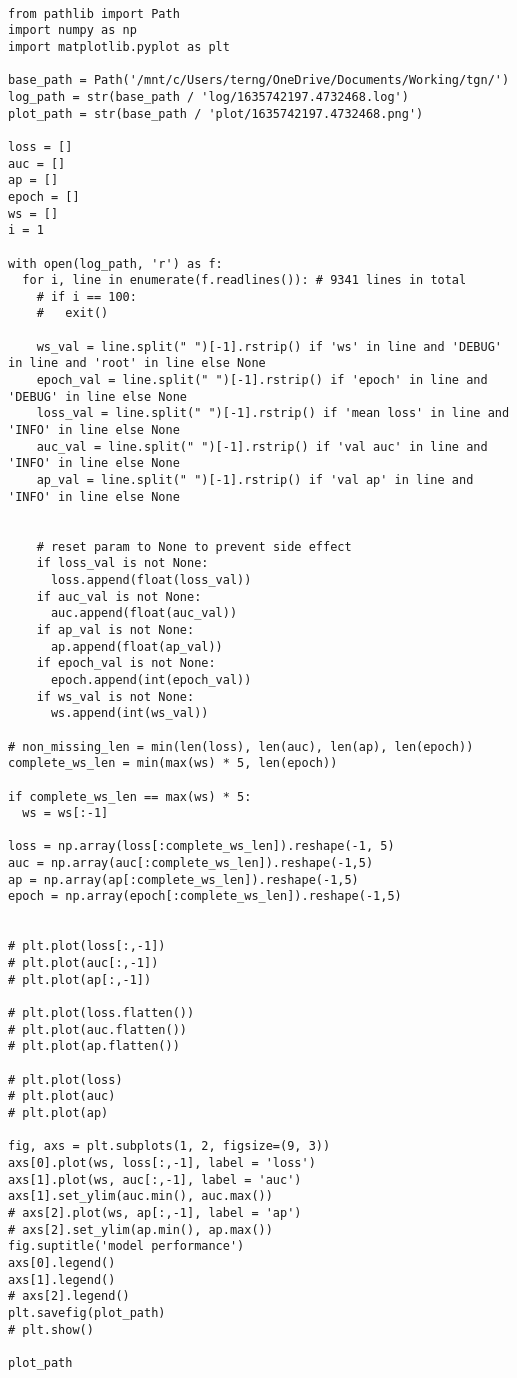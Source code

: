 \documentclass[11pt]{article}
\begin{document}
\begin{verbatim}

from pathlib import Path
import numpy as np
import matplotlib.pyplot as plt

base_path = Path('/mnt/c/Users/terng/OneDrive/Documents/Working/tgn/')
log_path = str(base_path / 'log/1635742197.4732468.log')
plot_path = str(base_path / 'plot/1635742197.4732468.png')

loss = []
auc = []
ap = []
epoch = []
ws = []
i = 1

with open(log_path, 'r') as f:
  for i, line in enumerate(f.readlines()): # 9341 lines in total
    # if i == 100:
    #   exit()

    ws_val = line.split(" ")[-1].rstrip() if 'ws' in line and 'DEBUG' in line and 'root' in line else None
    epoch_val = line.split(" ")[-1].rstrip() if 'epoch' in line and 'DEBUG' in line else None
    loss_val = line.split(" ")[-1].rstrip() if 'mean loss' in line and 'INFO' in line else None
    auc_val = line.split(" ")[-1].rstrip() if 'val auc' in line and 'INFO' in line else None
    ap_val = line.split(" ")[-1].rstrip() if 'val ap' in line and 'INFO' in line else None


    # reset param to None to prevent side effect
    if loss_val is not None:
      loss.append(float(loss_val))
    if auc_val is not None:
      auc.append(float(auc_val))
    if ap_val is not None:
      ap.append(float(ap_val))
    if epoch_val is not None:
      epoch.append(int(epoch_val))
    if ws_val is not None:
      ws.append(int(ws_val))

# non_missing_len = min(len(loss), len(auc), len(ap), len(epoch))
complete_ws_len = min(max(ws) * 5, len(epoch))

if complete_ws_len == max(ws) * 5:
  ws = ws[:-1]

loss = np.array(loss[:complete_ws_len]).reshape(-1, 5)
auc = np.array(auc[:complete_ws_len]).reshape(-1,5)
ap = np.array(ap[:complete_ws_len]).reshape(-1,5)
epoch = np.array(epoch[:complete_ws_len]).reshape(-1,5)


# plt.plot(loss[:,-1])
# plt.plot(auc[:,-1])
# plt.plot(ap[:,-1])

# plt.plot(loss.flatten())
# plt.plot(auc.flatten())
# plt.plot(ap.flatten())

# plt.plot(loss)
# plt.plot(auc)
# plt.plot(ap)

fig, axs = plt.subplots(1, 2, figsize=(9, 3))
axs[0].plot(ws, loss[:,-1], label = 'loss')
axs[1].plot(ws, auc[:,-1], label = 'auc')
axs[1].set_ylim(auc.min(), auc.max())
# axs[2].plot(ws, ap[:,-1], label = 'ap')
# axs[2].set_ylim(ap.min(), ap.max())
fig.suptitle('model performance')
axs[0].legend()
axs[1].legend()
# axs[2].legend()
plt.savefig(plot_path)
# plt.show()

plot_path

\end{verbatim}
\end{document}
